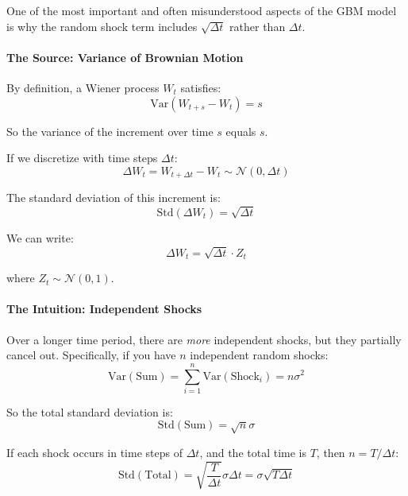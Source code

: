 \documentclass[12pt,a4paper]{article}
\begin{document}
One of the most important and often misunderstood aspects of the GBM model is why the random shock term includes $\sqrt{\Delta t}$ rather than $\Delta t$.

\paragraph{The Source: Variance of Brownian Motion}

By definition, a Wiener process $W_t$ satisfies:
\begin{equation}
\text{Var}(W_{t+s} - W_t) = s
\end{equation}

So the variance of the increment over time $s$ equals $s$.

If we discretize with time steps $\Delta t$:
\begin{equation}
\Delta W_t = W_{t+\Delta t} - W_t \sim \mathcal{N}(0, \Delta t)
\end{equation}

The standard deviation of this increment is:
\begin{equation}
\text{Std}(\Delta W_t) = \sqrt{\Delta t}
\end{equation}

We can write:
\begin{equation}
\Delta W_t = \sqrt{\Delta t} \cdot Z_t
\end{equation}

where $Z_t \sim \mathcal{N}(0, 1)$.

\paragraph{The Intuition: Independent Shocks}

Over a longer time period, there are \textit{more} independent shocks, but they partially cancel out. Specifically, if you have $n$ independent random shocks:
\begin{equation}
\text{Var}(\text{Sum}) = \sum_{i=1}^{n} \text{Var}(\text{Shock}_i) = n \sigma^2
\end{equation}

So the total standard deviation is:
\begin{equation}
\text{Std}(\text{Sum}) = \sqrt{n} \sigma
\end{equation}

If each shock occurs in time steps of $\Delta t$, and the total time is $T$, then $n = T/\Delta t$:
\begin{equation}
\text{Std}(\text{Total}) = \sqrt{\frac{T}{\Delta t}} \sigma \Delta t = \sigma \sqrt{T \Delta t}
\end{equation}
\end{document}
